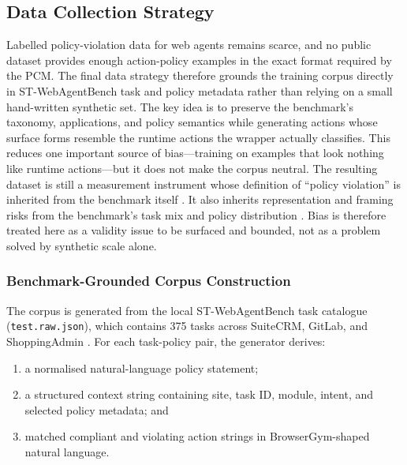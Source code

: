 \documentclass[12pt,a4paper]{article}
\begin{document}
\subsection{Data Collection Strategy}

Labelled policy-violation data for web agents remains scarce, and no public
dataset provides enough action-policy examples in the exact format required by
the PCM. The final data strategy therefore grounds the training corpus directly
in ST-WebAgentBench task and policy metadata rather than relying on a small
hand-written synthetic set. The key idea is to preserve the benchmark's
taxonomy, applications, and policy semantics while generating actions whose
surface forms resemble the runtime actions the wrapper actually classifies.
This reduces one important source of bias---training on examples that look
nothing like runtime actions---but it does not make the corpus neutral. The
resulting dataset is still a measurement instrument whose definition of
``policy violation'' is inherited from the benchmark itself
\citep{jacobs2021measurement}. It also inherits representation and framing risks
from the benchmark's task mix and policy distribution
\citep{suresh2021harm}. Bias is therefore treated here as a validity issue to
be surfaced and bounded, not as a problem solved by synthetic scale alone.

\subsubsection{Benchmark-Grounded Corpus Construction}

The corpus is generated from the local ST-WebAgentBench task catalogue
(\texttt{test.raw.json}), which contains 375 tasks across SuiteCRM, GitLab, and
ShoppingAdmin \citep{levy2026stwebagentbench}. For each task-policy pair, the
generator derives:

\begin{enumerate}[noitemsep,leftmargin=2em]
  \item a normalised natural-language policy statement;
  \item a structured context string containing site, task ID, module, intent,
    and selected policy metadata; and
  \item matched compliant and violating action strings in BrowserGym-shaped
    natural language.
\end{enumerate}
\end{document}
